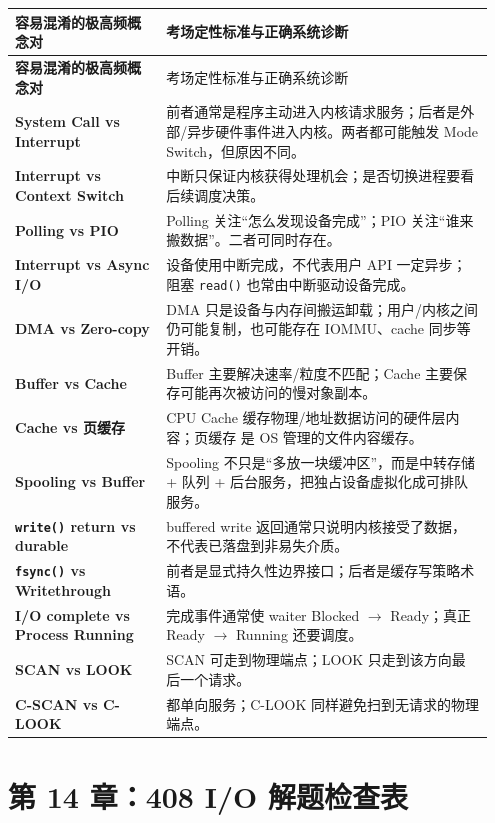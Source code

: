 \documentclass[11pt,a4paper]{ctexart}
\newcommand{\code}[1]{\texttt{#1}}
\begin{document}
\begingroup
\small
\renewcommand{\arraystretch}{1.25}
\begin{longtable}{>{\bfseries}p{0.3\linewidth} p{0.65\linewidth}}
\toprule
容易混淆的极高频概念对 & 考场定性标准与正确系统诊断 \\
\midrule
\endfirsthead
\toprule
容易混淆的极高频概念对 & 考场定性标准与正确系统诊断 \\
\midrule
\endhead
System Call vs Interrupt & 前者通常是程序主动进入内核请求服务；后者是外部/异步硬件事件进入内核。两者都可能触发 Mode Switch，但原因不同。\\
Interrupt vs Context Switch & 中断只保证内核获得处理机会；是否切换进程要看后续调度决策。\\
Polling vs PIO & Polling 关注“怎么发现设备完成”；PIO 关注“谁来搬数据”。二者可同时存在。\\
Interrupt vs Async I/O & 设备使用中断完成，不代表用户 API 一定异步；阻塞 \code{read()} 也常由中断驱动设备完成。\\
DMA vs Zero-copy & DMA 只是设备与内存间搬运卸载；用户/内核之间仍可能复制，也可能存在 IOMMU、cache 同步等开销。\\
Buffer vs Cache & Buffer 主要解决速率/粒度不匹配；Cache 主要保存可能再次被访问的慢对象副本。\\
Cache vs 页缓存 & CPU Cache 缓存物理/地址数据访问的硬件层内容；页缓存 是 OS 管理的文件内容缓存。\\
Spooling vs Buffer & Spooling 不只是“多放一块缓冲区”，而是中转存储 + 队列 + 后台服务，把独占设备虚拟化成可排队服务。\\
\code{write()} return vs durable & buffered write 返回通常只说明内核接受了数据，不代表已落盘到非易失介质。\\
\code{fsync()} vs Writethrough & 前者是显式持久性边界接口；后者是缓存写策略术语。\\
I/O complete vs Process Running & 完成事件通常使 waiter Blocked $\rightarrow$ Ready；真正 Ready $\rightarrow$ Running 还要调度。\\
SCAN vs LOOK & SCAN 可走到物理端点；LOOK 只走到该方向最后一个请求。\\
C-SCAN vs C-LOOK & 都单向服务；C-LOOK 同样避免扫到无请求的物理端点。\\
\bottomrule
\end{longtable}
\endgroup

\section{第 14 章：408 I/O 解题检查表}
\end{document}
